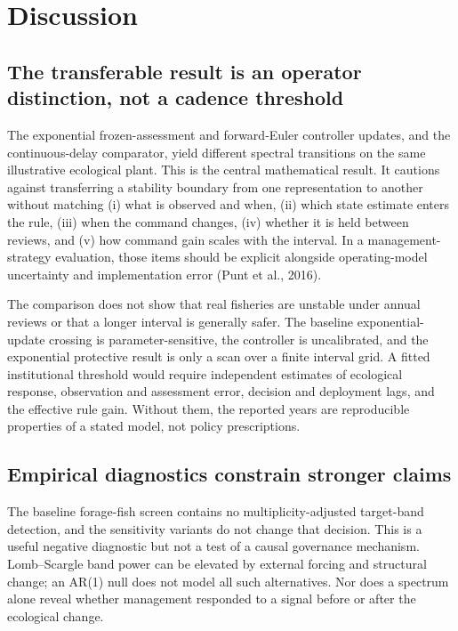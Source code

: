 \section{Discussion}\label{sec:discussion}

\subsection{The transferable result is an operator distinction, not a cadence threshold}

The exponential frozen-assessment and forward-Euler controller updates, and the continuous-delay comparator, yield different spectral transitions on the same illustrative ecological plant. This is the central mathematical result. It cautions against transferring a stability boundary from one representation to another without matching (i) what is observed and when, (ii) which state estimate enters the rule, (iii) when the command changes, (iv) whether it is held between reviews, and (v) how command gain scales with the interval. In a management-strategy evaluation, those items should be explicit alongside operating-model uncertainty and implementation error (Punt et al., 2016).

The comparison does not show that real fisheries are unstable under annual reviews or that a longer interval is generally safer. The baseline exponential-update crossing is parameter-sensitive, the controller is uncalibrated, and the exponential protective result is only a scan over a finite interval grid. A fitted institutional threshold would require independent estimates of ecological response, observation and assessment error, decision and deployment lags, and the effective rule gain. Without them, the reported years are reproducible properties of a stated model, not policy prescriptions.

\subsection{Empirical diagnostics constrain stronger claims}

The baseline forage-fish screen contains no multiplicity-adjusted target-band detection, and the sensitivity variants do not change that decision. This is a useful negative diagnostic but not a test of a causal governance mechanism. Lomb--Scargle band power can be elevated by external forcing and structural change; an AR(1) null does not model all such alternatives. Nor does a spectrum alone reveal whether management responded to a signal before or after the ecological change.

